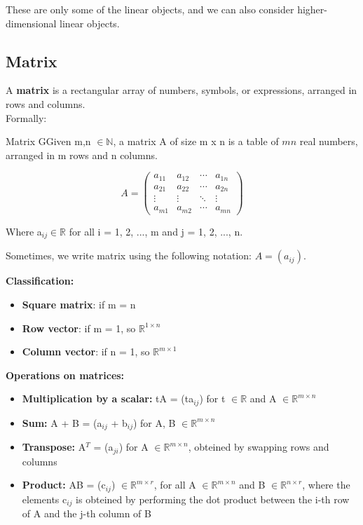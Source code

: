 \noindent
These are only some of the linear objects, and we can also consider higher-dimensional linear objects.

\subsection{Matrix}
A \textbf{matrix} is a rectangular array of numbers, symbols, or expressions, arranged in rows and columns.\\
Formally:
\begin{defBox}{Matrix}
    GGiven m,n $\in \mathbb{N}$, a matrix A of size m x n is a table of $mn$ real numbers, arranged in m rows and n columns.
     \begin{center}
        \[
        A =
        \begin{pmatrix}
        a_{11} & a_{12} & \cdots & a_{1n} \\
        a_{21} & a_{22} & \cdots & a_{2n} \\
        \vdots & \vdots & \ddots & \vdots \\
        a_{m1} & a_{m2} & \cdots & a_{mn}
        \end{pmatrix}
        \]
    \end{center}
    \noindent
    Where a$_{ij} \in \mathbb{R}$ for all i = 1, 2, ..., m and j = 1, 2, ..., n.
\end{defBox}

\noindent
Sometimes, we write matrix using the following notation: $A = (a_{ij})$.
\bigskip

\noindent
\textbf{Classification:}\\
\begin{itemize}
    \item \textbf{Square matrix}: if m = n
    \item \textbf{Row vector}: if m = 1, so $\mathbb{R}^{1\times n}$
    \item \textbf{Column vector}: if n = 1, so $\mathbb{R}^{m \times 1}$
\end{itemize}
\bigskip

\noindent
\textbf{Operations on matrices:}\\
\begin{itemize}
    \item \textbf{Multiplication by a scalar:} tA = (ta$_{ij}$) for t $\in \mathbb{R}$ and A $\in \mathbb{R}^{m \times n}$
    \item \textbf{Sum:} A + B = (a$_{ij}$ + b$_{ij}$) for A, B $\in \mathbb{R}^{m \times n}$
    \item \textbf{Transpose:} A$^T$ = (a$_{ji}$) for A $\in \mathbb{R}^{m \times n}$, obteined by swapping rows and columns
    \item \textbf{Product:} AB = (c$_{ij}$) $\in \mathbb{R}^{m \times r}$, for all A $\in \mathbb{R}^{m \times n}$ and B $\in \mathbb{R}^{n \times r}$, where the elements c$_{ij}$ is obteined by performing the dot product between the i-th row of A and the j-th column of B
\end{itemize}

